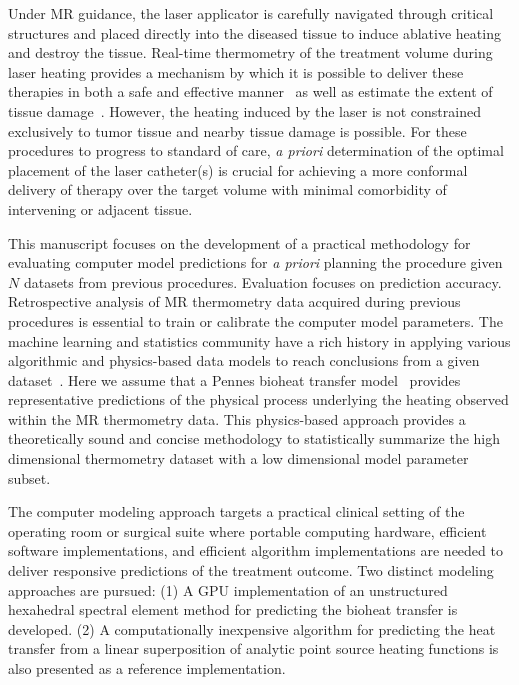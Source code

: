 \documentclass[12pt]{article}
\begin{document}
Under MR guidance, the laser applicator is carefully navigated through
critical structures and placed directly into the diseased tissue to induce
ablative heating and destroy the tissue. 
Real-time thermometry of the treatment volume during
laser heating provides a mechanism by which it is possible to deliver
these therapies in both a safe and effective 
manner~\cite{rieke2008mr, denis2005magnetic,stafford2010magnetic,
woodrum2010feasibility} as well as estimate the extent of tissue
damage~\cite{hyperthermia2003basic,mcdannold2006uterine,mcnichols2004technical}. 
However, the heating induced by the laser is not constrained exclusively
to tumor tissue and nearby tissue damage is possible. 
For these procedures to progress to standard of care, 
\textit{a priori} determination of the optimal placement of the laser catheter(s) is crucial
for achieving a more conformal delivery of therapy over the target volume
with minimal comorbidity of intervening or adjacent tissue. 

This manuscript focuses on the development of a practical methodology for
evaluating computer model predictions for \textit{a priori} planning the procedure  
given $N$ datasets from previous procedures.
{\color{red} Evaluation focuses on prediction accuracy.}
Retrospective analysis of MR thermometry data acquired during previous procedures is
essential to train or calibrate the computer model parameters. 
The machine learning and statistics community have a rich history in
applying various algorithmic and physics-based data models to reach conclusions from a
given dataset~\cite{Breiman2001,Hastie2005}. 
Here we assume that a Pennes bioheat transfer model~\cite{Pennes1948} provides
representative predictions of the  physical process underlying the heating
observed within the MR thermometry data.
This physics-based approach
provides a theoretically sound and concise methodology to statistically summarize the high
dimensional thermometry dataset with a low dimensional model parameter subset. 

The computer modeling approach targets a practical clinical setting of the operating room 
or surgical suite where portable computing hardware, efficient software implementations,
and efficient algorithm implementations are needed to deliver responsive predictions
of the treatment outcome.  Two distinct modeling approaches are pursued: 
(1) A GPU implementation of an unstructured hexahedral spectral element method
for predicting the bioheat transfer is developed. 
(2) A computationally inexpensive algorithm for predicting the heat transfer
from a linear superposition of analytic point source heating functions is also
presented as a reference implementation.
\end{document}
